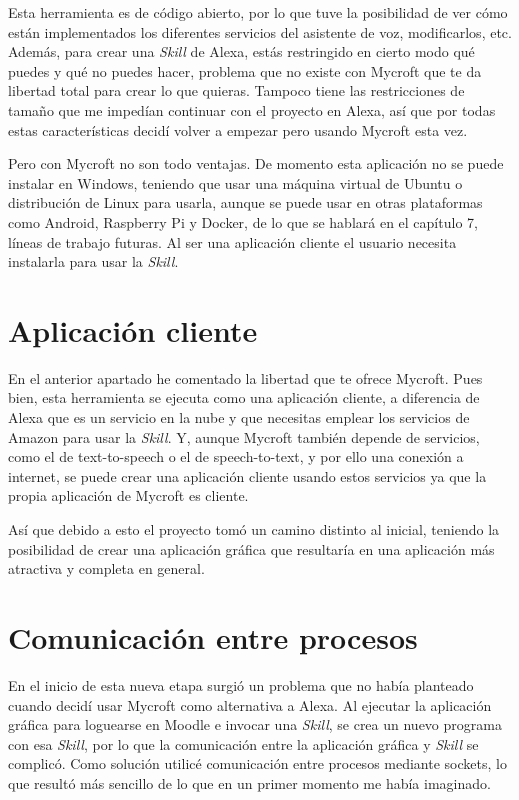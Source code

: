 Esta herramienta es de código abierto, por lo que tuve la posibilidad de ver cómo están implementados los diferentes servicios del asistente de voz, modificarlos, etc. Además, para crear una \textit{Skill} de Alexa, estás restringido en cierto modo qué puedes y qué no puedes hacer, problema que no existe con Mycroft que te da libertad total para crear lo que quieras. Tampoco tiene las restricciones de tamaño que me impedían continuar con el proyecto en Alexa, así que por todas estas características decidí volver a empezar pero usando Mycroft esta vez.

Pero con Mycroft no son todo ventajas. De momento esta aplicación no se puede instalar en Windows, teniendo que usar una máquina virtual de Ubuntu o distribución de Linux para usarla, aunque se puede usar en otras plataformas como Android, Raspberry Pi y Docker, de lo que se hablará en el capítulo 7, líneas de trabajo futuras. Al ser una aplicación cliente el usuario necesita instalarla para usar la \textit{Skill}.

\section{Aplicación cliente}

En el anterior apartado he comentado la libertad que te ofrece Mycroft. Pues bien, esta herramienta se ejecuta como una aplicación cliente, a diferencia de Alexa que es un servicio en la nube y que necesitas emplear los servicios de Amazon para usar la \textit{Skill}. Y, aunque Mycroft también depende de servicios, como el de text-to-speech o el de speech-to-text, y por ello una conexión a internet, se puede crear una aplicación cliente usando estos servicios ya que la propia aplicación de Mycroft es cliente.

Así que debido a esto el proyecto tomó un camino distinto al inicial, teniendo la posibilidad de crear una aplicación gráfica que resultaría en una aplicación más atractiva y completa en general.

\section{Comunicación entre procesos}

En el inicio de esta nueva etapa surgió un problema que no había planteado cuando decidí usar Mycroft como alternativa a Alexa. Al ejecutar la aplicación gráfica para loguearse en Moodle e invocar una \textit{Skill}, se crea un nuevo programa con esa \textit{Skill}, por lo que la comunicación entre la aplicación gráfica y \textit{Skill} se complicó. Como solución utilicé comunicación entre procesos mediante sockets, lo que resultó más sencillo de lo que en un primer momento me había imaginado.

